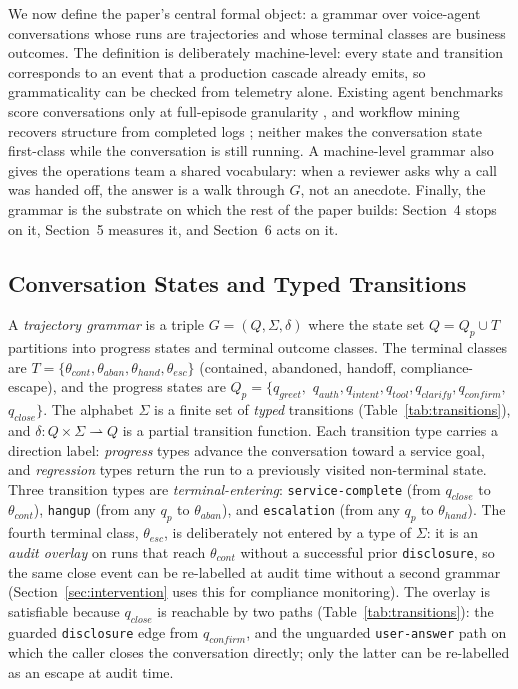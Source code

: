 We now define the paper's central formal object: a grammar over voice-agent conversations whose
runs are trajectories and whose terminal classes are business outcomes.
The definition is deliberately machine-level: every state and transition corresponds to an event
that a production cascade already emits, so grammaticality can be checked from telemetry alone.
Existing agent benchmarks score conversations only at full-episode granularity
\citep{sierra2024taubench,webarena2023}, and workflow mining recovers structure from completed
logs \citep{salesforce2025workflows}; neither makes the conversation state first-class while the
conversation is still running.
A machine-level grammar also gives the operations team a shared vocabulary: when a reviewer asks
why a call was handed off, the answer is a walk through $G$, not an anecdote.
Finally, the grammar is the substrate on which the rest of the paper builds: Section~4 stops on it,
Section~5 measures it, and Section~6 acts on it.

\subsection{Conversation States and Typed Transitions}

\begin{definition}
\label{def:grammar}
A \emph{trajectory grammar} is a triple $G = (Q, \Sigma, \delta)$ where the state set
$Q = Q_p \cup T$ partitions into progress states and terminal outcome classes.
The terminal classes are
$T = \{\theta_{cont}, \theta_{aban}, \theta_{hand}, \theta_{esc}\}$
(contained, abandoned, handoff, compliance-escape), and the progress states are
$Q_p = \{q_{greet},$ $q_{auth}, q_{intent}, q_{tool}, q_{clarify}, q_{confirm},$ $q_{close}\}$.
The alphabet $\Sigma$ is a finite set of \emph{typed} transitions (Table~\ref{tab:transitions}),
and $\delta : Q \times \Sigma \rightharpoonup Q$ is a partial transition function.
Each transition type carries a direction label: \emph{progress} types advance the conversation
toward a service goal, and \emph{regression} types return the run to a previously visited
non-terminal state.
Three transition types are \emph{terminal-entering}: \texttt{service-complete} (from $q_{close}$ to
$\theta_{cont}$), \texttt{hangup} (from any $q_p$ to $\theta_{aban}$), and \texttt{escalation}
(from any $q_p$ to $\theta_{hand}$).
The fourth terminal class, $\theta_{esc}$, is deliberately not entered by a type of $\Sigma$:
it is an \emph{audit overlay} on runs that reach $\theta_{cont}$ without a successful prior
\texttt{disclosure}, so the same close event can be re-labelled at audit time without a second
grammar (Section~\ref{sec:intervention} uses this for compliance monitoring).
The overlay is satisfiable because $q_{close}$ is reachable by two paths (Table~\ref{tab:transitions}):
the guarded \texttt{disclosure} edge from $q_{confirm}$, and the unguarded \texttt{user-answer}
path on which the caller closes the conversation directly; only the latter can be re-labelled as
an escape at audit time.
\end{definition}

